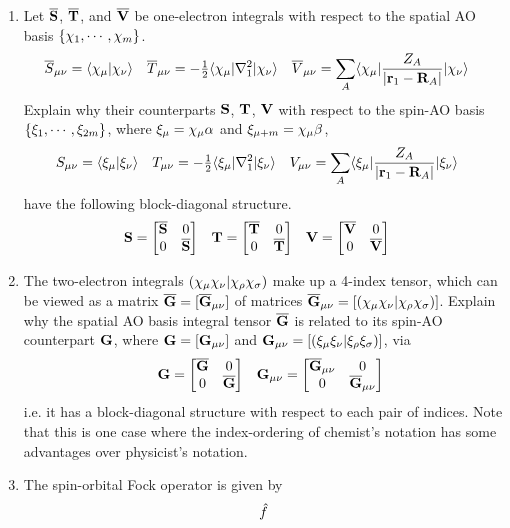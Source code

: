 \documentclass[fleqn,11pt]{article}
\begin{document}
\begin{enumerate}
  \item Let $\overline{\mathbf{S}}$, $\overline{\mathbf{T}}$, and $\overline{\mathbf{V}}$ be one-electron integrals with respect to the spatial AO basis $\{\chi_1,\cdots,\chi_m\}$.
\begin{align}
\label{space-ao-ints}
&
  \overline{S}_{\mu\nu}
=
  \langle\chi_{\mu}|\chi_{\nu}\rangle
&&
  \overline{T}_{\mu\nu}
=
  -\tfrac{1}{2}\langle\chi_{\mu}|\nabla_1^2|\chi_{\nu}\rangle
&&
  \overline{V}_{\mu\nu}
=
  \sum_A\langle\chi_{\mu}|\dfrac{Z_A}{|\mathbf{r}_1-\mathbf{R}_A|}|\chi_{\nu}\rangle
\end{align}
  Explain why their counterparts $\mathbf{S}$, $\mathbf{T}$, $\mathbf{V}$ with respect to the spin-AO basis $\{\xi_1,\cdots,\xi_{2m}\}$, where $\xi_\mu=\chi_\mu\alpha$ and $\xi_{\mu+m}=\chi_\mu\beta$,
\begin{align}
\label{space-ao-ints}
&
  S_{\mu\nu}
=
  \langle\xi_{\mu}|\xi_{\nu}\rangle
&&
  T_{\mu\nu}
=
  -\tfrac{1}{2}\langle\xi_{\mu}|\nabla_1^2|\xi_{\nu}\rangle
&&
  V_{\mu\nu}
=
  \sum_A\langle\xi_{\mu}|\dfrac{Z_A}{|\mathbf{r}_1-\mathbf{R}_A|}|\xi_{\nu}\rangle
\end{align}
have the following block-diagonal structure.
\begin{align}
\label{spin-ao-ints-1}
&
  \mathbf{S}
=
  \begin{bmatrix}\overline{\mathbf{S}}&0\\0&\overline{\mathbf{S}}\end{bmatrix}
&&
  \mathbf{T}
=
  \begin{bmatrix}\overline{\mathbf{T}}&0\\0&\overline{\mathbf{T}}\end{bmatrix}
&&
  \mathbf{V}
=
  \begin{bmatrix}\overline{\mathbf{V}}&0\\0&\overline{\mathbf{V}}\end{bmatrix}
\end{align}
  \item The two-electron integrals $(\chi_\mu\chi_\nu|\chi_\rho\chi_\sigma)$ make up a 4-index tensor, which can be viewed as a matrix $\overline{\mathbf{G}}=[\overline{\mathbf{G}}_{\mu\nu}]$ of matrices $\overline{\mathbf{G}}_{\mu\nu}=[(\chi_\mu\chi_\nu|\chi_\rho\chi_\sigma)]$.
  Explain why the spatial AO basis integral tensor $\overline{\mathbf{G}}$ is related to its spin-AO counterpart $\mathbf{G}$, where $\mathbf{G}=[\mathbf{G}_{\mu\nu}]$ and $\mathbf{G}_{\mu\nu}=[(\xi_\mu\xi_\nu|\xi_\rho\xi_\sigma)]$, via
\begin{align}
&&
  \mathbf{G}
=
  \begin{bmatrix}\overline{\mathbf{G}}&0\\0&\overline{\mathbf{G}}\end{bmatrix}
&&
  \mathbf{G}_{\mu\nu}
=
  \begin{bmatrix}\overline{\mathbf{G}}_{\mu\nu}&0\\0&\overline{\mathbf{G}}_{\mu\nu}\end{bmatrix}
\end{align}
  i.e. it has a block-diagonal structure with respect to each pair of indices.
  Note that this is one case where the index-ordering of chemist's notation has some advantages over physicist's notation.
  \item The spin-orbital Fock operator is given by
\begin{align}
  \op{f}

\end{align}
\end{enumerate}
\end{document}

